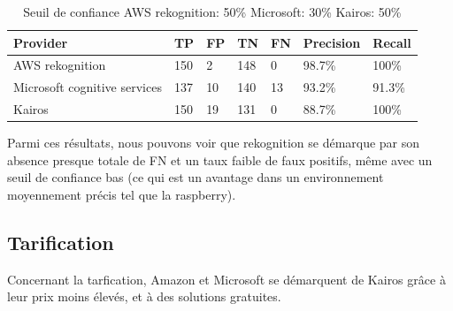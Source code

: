 \begin{table}[H]
\begin{tabular}{|m{2cm} | m{2cm} | m{2cm} | m{2cm} |m{2cm} |m{2cm} |m{2cm}|}
\hline
{\color[HTML]{000000} \textbf{Provider}}              & {\color[HTML]{000000} \textbf{TP}} & {\color[HTML]{000000} \textbf{FP}} & {\color[HTML]{000000} \textbf{TN}} & {\color[HTML]{000000} \textbf{FN}} & {\color[HTML]{000000} \textbf{Precision}} & {\color[HTML]{000000} \textbf{Recall}} \\ \hline
{\color[HTML]{000000} AWS rekognition}                & {\color[HTML]{000000} 150}                    & {\color[HTML]{000000} 2}                       & {\color[HTML]{000000} 148}                    & {\color[HTML]{000000} 0}                       & {\color[HTML]{000000} 98.7\%}                          & {\color[HTML]{000000} 100\%}                        \\ \hline
{\color[HTML]{000000} Microsoft cognitive   services} & {\color[HTML]{000000} 137}                    & {\color[HTML]{000000} 10}                      & {\color[HTML]{000000} 140}                    & {\color[HTML]{000000} 13}                      & {\color[HTML]{000000} 93.2\%}                          & {\color[HTML]{000000} 91.3\%}                       \\ \hline
{\color[HTML]{000000} Kairos}                         & {\color[HTML]{000000} 150}                    & {\color[HTML]{000000} 19}                      & {\color[HTML]{000000} 131}                    & {\color[HTML]{000000} 0}                       & {\color[HTML]{000000} 88.7\%}                          & {\color[HTML]{000000} 100\%}                        \\ \hline
\end{tabular}
\caption{Seuil de confiance AWS rekognition: 50\% Microsoft: 30\% Kairos: 50\%}
\end{table}

Parmi ces résultats, nous pouvons voir que rekognition se démarque par son absence presque totale de FN et un
taux faible de faux positifs, même avec un seuil de confiance bas (ce qui est un avantage dans un environnement
moyennement précis tel que la raspberry).

\subsection{Tarification}

Concernant la tarfication, Amazon et Microsoft se démarquent de Kairos grâce à leur prix moins élevés, et à des
solutions gratuites.

